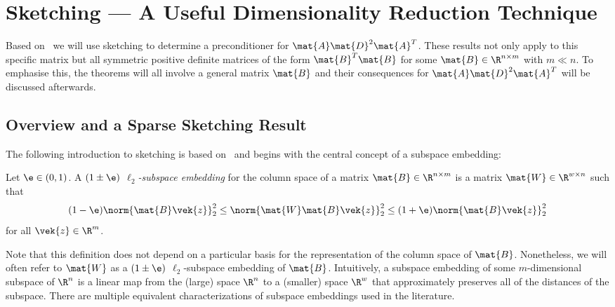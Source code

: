 \chapter{Sketching --- A Useful Dimensionality Reduction Technique}\label{chap:sketching}

Based on~\cite{Avron-FasterRandomizedInfeasibleIPMs} we will use sketching to determine a preconditioner for \(\mat{A} \mat{D}^2 \mat{A}^T\).
These results not only apply to this specific matrix but all symmetric positive definite matrices of the form \(\mat{B}^T \mat{B}\) for some \(\mat{B} \in \R^{n \times m}\) with \(m \ll n\).
To emphasise this, the theorems will all involve a general matrix \(\mat{B}\) and their consequences for \(\mat{A}\mat{D}^2\mat{A}^T\) will be discussed afterwards.

\section{Overview and a Sparse Sketching Result}\label{sec:sketching-overview}

The following introduction to sketching is based on~\cite{Woodruff-Sketching} and begins with the central concept of a subspace embedding:
\begin{definition}\label{def:subspace-embedding}
Let \(\e \in (0, 1)\). A \emph{\((1 \pm \e)\) \(\ell_2\)-subspace embedding} for the column space of a matrix \(\mat{B} \in \R^{n \times m}\) is a matrix \(\mat{W} \in \R^{w \times n}\) such that
\[ (1-\e) \norm{\mat{B}\vek{z}}_2^2 \leq \norm{\mat{W}\mat{B}\vek{z}}_2^2 \leq (1+\e)\norm{\mat{B}\vek{z}}_2^2 \]
for all \(\vek{z} \in \R^m\).
\end{definition}
Note that this definition does not depend on a particular basis for the representation of the column space of \(\mat{B}\).
Nonetheless, we will often refer to \(\mat{W}\) as a \((1\pm\e)\) \(\ell_2\)-subspace embedding of \(\mat{B}\).
Intuitively, a subspace embedding of some \(m\)-dimensional subspace of \(\R^n\) is a linear map from the (large) space \(\R^n\) to a (smaller) space \(\R^w\) that approximately preserves all of the distances of the subspace.
There are multiple equivalent characterizations of subspace embeddings used in the literature.

